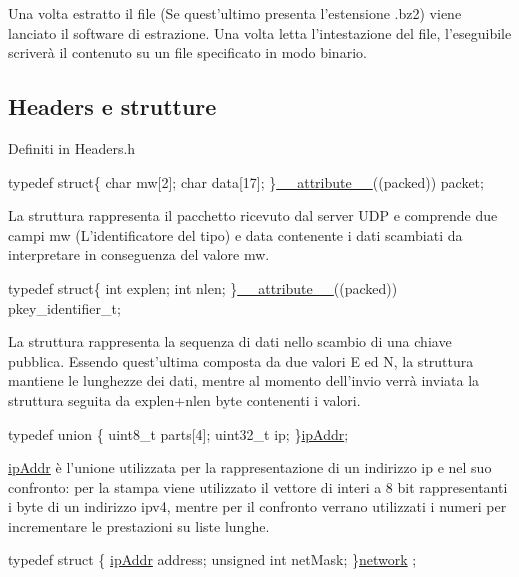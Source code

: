 Una volta estratto il file (Se quest’ultimo presenta l’estensione .bz2) viene lanciato il software di estrazione. Una volta letta l’intestazione del file, l’eseguibile scriverà il contenuto su un file specificato in modo binario.

\subsection*{Headers e strutture}

Definiti in Headers.\+h


\begin{DoxyCode}
\textcolor{keyword}{typedef} \textcolor{keyword}{struct}\{
   \textcolor{keywordtype}{char} mw[2];
   \textcolor{keywordtype}{char} data[17];
\}\hyperlink{struct____attribute____}{\_\_attribute\_\_}((packed)) packet;
\end{DoxyCode}
 La struttura rappresenta il pacchetto ricevuto dal server U\+DP e comprende due campi mw (L’identificatore del tipo) e data contenente i dati scambiati da interpretare in conseguenza del valore mw. 
\begin{DoxyCode}
\textcolor{keyword}{typedef} \textcolor{keyword}{struct}\{
   \textcolor{keywordtype}{int} explen;
   \textcolor{keywordtype}{int} nlen;
\}\hyperlink{struct____attribute____}{\_\_attribute\_\_}((packed)) pkey\_identifier\_t;
\end{DoxyCode}
 La struttura rappresenta la sequenza di dati nello scambio di una chiave pubblica. Essendo quest’ultima composta da due valori E ed N, la struttura mantiene le lunghezze dei dati, mentre al momento dell’invio verrà inviata la struttura seguita da explen+nlen byte contenenti i valori. 
\begin{DoxyCode}
\textcolor{keyword}{typedef} \textcolor{keyword}{union }\{
   uint8\_t parts[4];
   uint32\_t ip;
\}\hyperlink{unionipAddr}{ipAddr};
\end{DoxyCode}
 \hyperlink{unionipAddr}{ip\+Addr} è l’unione utilizzata per la rappresentazione di un indirizzo ip e nel suo confronto\+: per la stampa viene utilizzato il vettore di interi a 8 bit rappresentanti i byte di un indirizzo ipv4, mentre per il confronto verrano utilizzati i numeri per incrementare le prestazioni su liste lunghe. 
\begin{DoxyCode}
\textcolor{keyword}{typedef} \textcolor{keyword}{struct }\{
   \hyperlink{unionipAddr}{ipAddr} address;
   \textcolor{keywordtype}{unsigned} \textcolor{keywordtype}{int} netMask;
\}\hyperlink{structnetwork}{network} ;
\end{DoxyCode}


